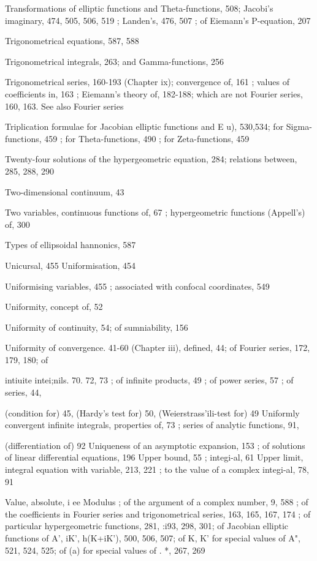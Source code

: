 Transformations of elliptic functions and Theta-functions, 508; Jacobi's imaginary, 474, 505,
506, 519 ; Landen's, 476, 507 ; of Eiemann's P-equation, 207

Trigonometrical equations, 587, 588

Trigonometrical integrals, 263; and Gamma-functions, 256

Trigonometrical series, 160-193 (Chapter ix); convergence of, 161 ; values of coefficients in, 163 ;
Eiemann's theory of, 182-188; which are not Fourier series, 160, 163. See also Fourier series

Triplication formulae for Jacobian elliptic functions and E  u), 530,534; for Sigma-functions,
459 ; for Theta-functions, 490 ; for Zeta-functions, 459

Twenty-four solutions of the hypergeometric equation, 284; relations between, 285, 288, 290

Two-dimensional continuum, 43

Two variables, continuous functions of, 67 ; hypergeometric functions (Appell's) of, 300

Types of ellipsoidal hannonics, 587

Unicursal, 455
Uniformisation, 454

%
%

Uniformising variables, 455 ; associated with confocal coordinates, 549

Uniformity, concept of, 52

Uniformity of continuity, 54; of sumniability, 156

Uniformity of convergence. 41-60 (Chapter iii), defined, 44; of Fourier series, 172, 179, 180; of

intiuite intei;nils. 70. 72, 73 ; of infinite products, 49 ; of power series, 57 ; of series, 44,

(condition for) 45, (Hardy's test for) 50, (Weierstrass'ili-test for) 49
Uniformly convergent infinite integrals, properties of, 73 ; series of analytic functions, 91,

(differentiation of) 92
Uniqueness of an asymptotic expansion, 153 ; of solutions of linear differential equations, 196
Upper bound, 55 ; integi-al, 61
Upper limit, integral equation with variable, 213, 221 ; to the value of a complex integi-al, 78, 91

Value, absolute, i ee Modulus ; of the argument of a complex number, 9, 588 ; of the coefficients
in Fourier series and trigonometrical series, 163, 165, 167, 174 ; of particular hypergeometric
functions, 281, :i93, 298, 301; of Jacobian elliptic functions of  A',  iK', h(K+iK'), 500,
506, 507; of K, K' for special values of A", 521, 524, 525; of  (a) for special values of . *,
267, 269

